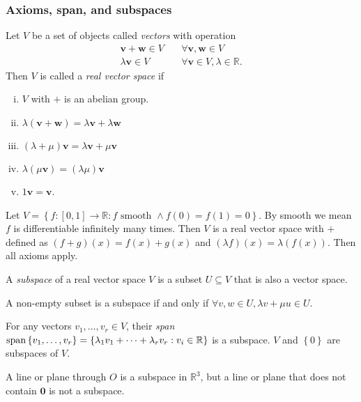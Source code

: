 \documentclass[a4paper]{article}
\begin{document}
\subsubsection{Axioms, span, and subspaces}
\begin{definition}
  Let $V$ be a set of objects called \textit{vectors} with operation
  \[
    \begin{aligned}
      \mathbf{v}+\mathbf{w}\in V&\quad \forall \mathbf{v},\mathbf{w}\in V\\
      \lambda \mathbf{v}\in V&\quad \forall \mathbf{v}\in V,
      \lambda\in \mathbb{R}.
    \end{aligned}
  \]
  Then $V$ is called a \textit{real vector space} if
  \begin{enumerate}[(i).]
    \item $V$ with $+$ is an abelian group.
    \item $ \lambda(\mathbf{v}+\mathbf{w})=\lambda \mathbf{v}+\lambda
      \mathbf{w} $
    \item $ (\lambda+\mu)\mathbf{v}=\lambda \mathbf{v}+\mu \mathbf{v} $
    \item $ \lambda(\mu \mathbf{v})=(\lambda \mu) \mathbf{v} $
    \item $ 1 \mathbf{v}=\mathbf{v} $.
  \end{enumerate}
\end{definition}
\begin{example}
  Let $ V=\left\{ f:[0,1] \to \mathbb{R} : f\text{ smooth } \land
  f(0)=f(1)=0\right\} $. By smooth we mean $f$ is differentiable
  infinitely many times. Then $V$ is a real vector space with $+$
  defined as $ (f+g)(x)=f(x)+g(x) $ and $ (\lambda
  f)(x)=\lambda(f(x)) $. Then all axioms apply.
\end{example}
\begin{definition}
  A \textit{subspace} of a real vector space $V$ is a subset $U
  \subseteq V$ that is also a vector space.
\end{definition}
\begin{remark}
  A non-empty subset is a subspace if and only if $ \forall v,w\in U,
  \lambda v+ \mu u\in U $.
\end{remark}
For any vectors $ v_1,\dots,v_r\in V $, their \textit{span} $
\operatorname{span}\left\{ v_1,\dots,v_r\right\}=\left\{ \lambda_1
v_1+\cdots+\lambda_r v_r:v_i\in \mathbb{R} \right\} $ is a subspace.
$V$ and $ \left\{ 0\right\} $ are subspaces of $V$.
\begin{example}
  A line or plane through $O$ is a subspace in $ \mathbb{R}^3 $, but
  a line or plane that does not contain $ \mathbf{0} $ is not a subspace.
\end{example}
\end{document}
